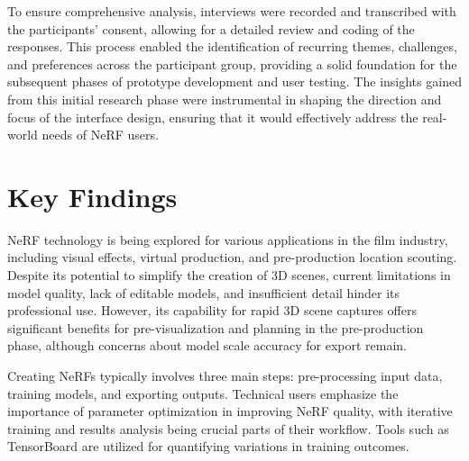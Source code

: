 To ensure comprehensive analysis, interviews were recorded and transcribed with the participants' consent, allowing for a detailed review and coding of the responses. 
This process enabled the identification of recurring themes, challenges, and preferences across the participant group, providing a solid foundation for the subsequent phases of prototype development and user testing. 
The insights gained from this initial research phase were instrumental in shaping the direction and focus of the interface design, ensuring that it would effectively address the real-world needs of NeRF users.

\section{Key Findings}
\label{sec:user-research:findings}


NeRF technology is being explored for various applications in the film industry, including visual effects, virtual production, and pre-production location scouting. 
Despite its potential to simplify the creation of 3D scenes, current limitations in model quality, lack of editable models, and insufficient detail hinder its professional use. 
However, its capability for rapid 3D scene captures offers significant benefits for pre-visualization and planning in the pre-production phase, although concerns about model scale accuracy for export remain. 
\cite{P2, P4}



Creating NeRFs typically involves three main steps: pre-processing input data, training models, and exporting outputs. 
Technical users emphasize the importance of parameter optimization in improving NeRF quality, with iterative training and results analysis being crucial parts of their workflow.
Tools such as TensorBoard \cite{noauthor_tensorflowtensorboard_2024} are utilized for quantifying variations in training outcomes. 
\cite{P1, P3}


